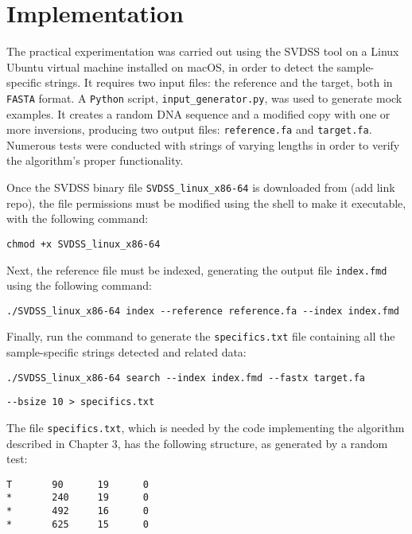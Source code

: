 \section{Implementation}
The practical experimentation was carried out using the SVDSS \cite{khorsand_parsoasvdss_2024} tool on a Linux Ubuntu virtual machine installed on macOS, in order to detect the sample-specific strings. It requires two input files: the reference and the target, both in \texttt{FASTA} format. A \texttt{Python} script, \texttt{input\_generator.py}, was used to generate mock examples. It creates a random DNA sequence and a modified copy with one or more inversions, producing two output files: \texttt{reference.fa} and \texttt{target.fa}. Numerous tests were conducted with strings of varying lengths in order to verify the algorithm’s proper functionality.

Once the SVDSS binary file \texttt{SVDSS\_linux\_x86-64} is downloaded from (add link repo), the file permissions must be modified using the shell to make it executable, with the following command: 

\begin{verbatim}
chmod +x SVDSS_linux_x86-64
\end{verbatim}

Next, the reference file must be indexed, generating the output file \texttt{index.fmd} using the following command: 

\begin{verbatim}
./SVDSS_linux_x86-64 index --reference reference.fa --index index.fmd
\end{verbatim}

Finally, run the command to generate the \texttt{specifics.txt} file containing all the sample-specific strings detected and related data: 

\begin{verbatim}
./SVDSS_linux_x86-64 search --index index.fmd --fastx target.fa  
\end{verbatim}

\begin{verbatim}
--bsize 10 > specifics.txt
\end{verbatim}

The file \texttt{specifics.txt}, which is needed by the code implementing the algorithm described in Chapter 3, has the following structure, as generated by a random test:

\begin{verbatim}
T       90      19      0
*       240     19      0
*       492     16      0
*       625     15      0
\end{verbatim}

